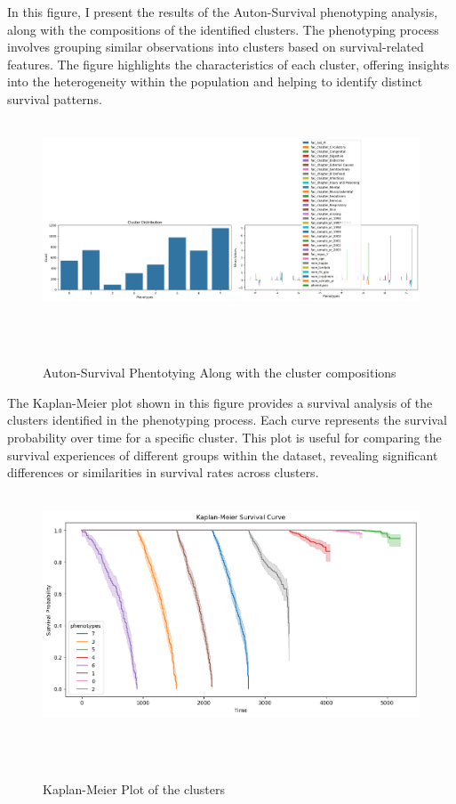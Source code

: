 \begin{landscape}
\noindent In this figure, I present the results of the Auton-Survival phenotyping analysis, along with the compositions of the identified clusters. The phenotyping process involves grouping similar observations into clusters based on survival-related features. The figure highlights the characteristics of each cluster, offering insights into the heterogeneity within the population and helping to identify distinct survival patterns.
\begin{figure}[h]
    \centering
    \includegraphics[scale=0.5]{Figures/EDA/clusters.png}
    \caption{Auton-Survival Phentotying Along with the cluster compositions}
    \label{fig:clusters}
\end{figure}
\end{landscape}
\clearpage
\noindent The Kaplan-Meier plot shown in this figure provides a survival analysis of the clusters identified in the phenotyping process. Each curve represents the survival probability over time for a specific cluster. This plot is useful for comparing the survival experiences of different groups within the dataset, revealing significant differences or similarities in survival rates across clusters.
\begin{figure}[h]
    \centering
    \includegraphics[scale=0.30]{Figures/EDA/cluster_kaplan.png}
    \caption{Kaplan-Meier Plot of the clusters}
    \label{fig:your_label}
\end{figure}

